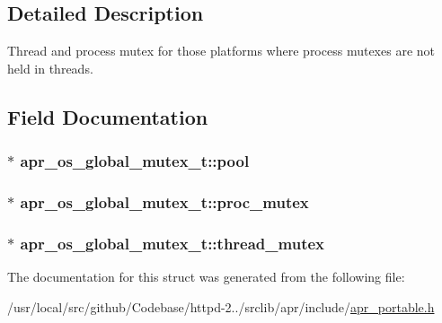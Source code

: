 \subsection{Detailed Description}
Thread and process mutex for those platforms where process mutexes are not held in threads. 

\subsection{Field Documentation}
\subsubsection[{\texorpdfstring{pool}{pool}}]{$\ast$ apr\+\_\+os\+\_\+global\+\_\+mutex\+\_\+t\+::pool}\hypertarget{structapr__os__global__mutex__t_a13624705c6a07c55db295d2bfe2f94a9}{}\label{structapr__os__global__mutex__t_a13624705c6a07c55db295d2bfe2f94a9}
\subsubsection[{\texorpdfstring{proc\+\_\+mutex}{proc_mutex}}]{$\ast$ apr\+\_\+os\+\_\+global\+\_\+mutex\+\_\+t\+::proc\+\_\+mutex}\hypertarget{structapr__os__global__mutex__t_aec060b8739b0d1b42360424216bbf399}{}\label{structapr__os__global__mutex__t_aec060b8739b0d1b42360424216bbf399}
\subsubsection[{\texorpdfstring{thread\+\_\+mutex}{thread_mutex}}]{$\ast$ apr\+\_\+os\+\_\+global\+\_\+mutex\+\_\+t\+::thread\+\_\+mutex}\hypertarget{structapr__os__global__mutex__t_afafd671d5466f97b1e1539062f76940a}{}\label{structapr__os__global__mutex__t_afafd671d5466f97b1e1539062f76940a}


The documentation for this struct was generated from the following file\+:\begin{DoxyCompactItemize}
\item 
/usr/local/src/github/\+Codebase/httpd-\/2../srclib/apr/include/\hyperlink{apr__portable_8h}{apr\+\_\+portable.\+h}\end{DoxyCompactItemize}
